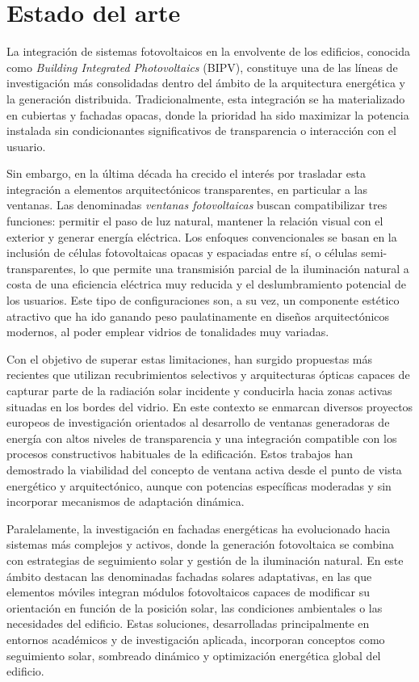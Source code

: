 \chapter{Estado del arte}\label{chapter:eoa}


La integración de sistemas fotovoltaicos en la envolvente de los edificios, conocida como \textit{Building Integrated Photovoltaics} (BIPV), constituye una de las líneas de investigación más consolidadas dentro del ámbito de la arquitectura energética y la generación distribuida. Tradicionalmente, esta integración se ha materializado en cubiertas y fachadas opacas, donde la prioridad ha sido maximizar la potencia instalada sin condicionantes significativos de transparencia o interacción con el usuario.

Sin embargo, en la última década ha crecido el interés por trasladar esta integración a elementos arquitectónicos transparentes, en particular a las ventanas. Las denominadas \textit{ventanas fotovoltaicas} buscan compatibilizar tres funciones: permitir el paso de luz natural, mantener la relación visual con el exterior y generar energía eléctrica. Los enfoques convencionales se basan en la inclusión de células fotovoltaicas opacas y espaciadas entre sí, o células semi-transparentes, lo que permite una transmisión parcial de la iluminación natural a costa de una eficiencia eléctrica muy reducida y el deslumbramiento potencial de los usuarios. Este tipo de configuraciones son, a su vez, un componente estético atractivo que ha ido ganando peso paulatinamente en diseños arquitectónicos modernos, al poder emplear vidrios de tonalidades muy variadas.  

Con el objetivo de superar estas limitaciones, han surgido propuestas más recientes que utilizan recubrimientos selectivos y arquitecturas ópticas capaces de capturar parte de la radiación solar incidente y conducirla hacia zonas activas situadas en los bordes del vidrio. En este contexto se enmarcan diversos proyectos europeos de investigación orientados al desarrollo de ventanas generadoras de energía con altos niveles de transparencia y una integración compatible con los procesos constructivos habituales de la edificación. Estos trabajos han demostrado la viabilidad del concepto de ventana activa desde el punto de vista energético y arquitectónico, aunque con potencias específicas moderadas y sin incorporar mecanismos de adaptación dinámica.

Paralelamente, la investigación en fachadas energéticas ha evolucionado hacia sistemas más complejos y activos, donde la generación fotovoltaica se combina con estrategias de seguimiento solar y gestión de la iluminación natural. En este ámbito destacan las denominadas fachadas solares adaptativas, en las que elementos móviles integran módulos fotovoltaicos capaces de modificar su orientación en función de la posición solar, las condiciones ambientales o las necesidades del edificio. Estas soluciones, desarrolladas principalmente en entornos académicos y de investigación aplicada, incorporan conceptos como seguimiento solar, sombreado dinámico y optimización energética global del edificio.


